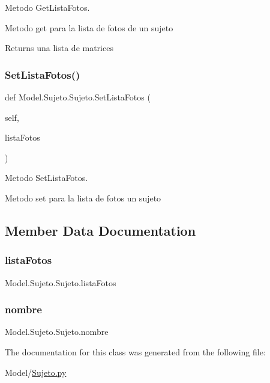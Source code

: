 Metodo Get\+Lista\+Fotos. 

Metodo get para la lista de fotos de un sujeto \begin{DoxyReturn}{Returns}
una lista de matrices 
\end{DoxyReturn}
\mbox{\label{class_model_1_1_sujeto_1_1_sujeto_acce1a348d76576f060bc5172f641f0ce}} 
\subsubsection{\texorpdfstring{Set\+Lista\+Fotos()}{SetListaFotos()}}
{\footnotesize\ttfamily def Model.\+Sujeto.\+Sujeto.\+Set\+Lista\+Fotos (\begin{DoxyParamCaption}\item[{}]{self,  }\item[{}]{lista\+Fotos }\end{DoxyParamCaption})}



Metodo Set\+Lista\+Fotos. 

Metodo set para la lista de fotos un sujeto 

\subsection{Member Data Documentation}
\mbox{\label{class_model_1_1_sujeto_1_1_sujeto_ad0257b41836e860b153a1194e1ddab93}} 
\subsubsection{\texorpdfstring{lista\+Fotos}{listaFotos}}
{\footnotesize\ttfamily Model.\+Sujeto.\+Sujeto.\+lista\+Fotos}

\mbox{\label{class_model_1_1_sujeto_1_1_sujeto_a5d96264282bc196e9c0c7d5800837c37}} 
\subsubsection{\texorpdfstring{nombre}{nombre}}
{\footnotesize\ttfamily Model.\+Sujeto.\+Sujeto.\+nombre}



The documentation for this class was generated from the following file\+:\begin{DoxyCompactItemize}
\item 
Model/\hyperlink{_sujeto_8py}{Sujeto.\+py}\end{DoxyCompactItemize}
